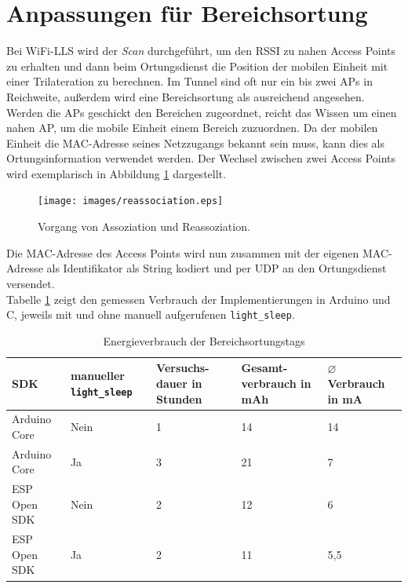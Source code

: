 \section{Anpassungen für Bereichsortung}
\label{ch:phase1:sec:anpassungbereich}
Bei WiFi-LLS wird der \emph{Scan} durchgeführt, um den RSSI zu nahen Access Points zu erhalten und dann beim Ortungsdienst die Position der mobilen Einheit mit einer Trilateration zu berechnen.
Im Tunnel sind oft nur ein bis zwei APs in Reichweite, außerdem wird eine Bereichsortung als ausreichend angesehen. \\
Werden die APs geschickt den Bereichen zugeordnet, reicht das Wissen um einen nahen AP, um die mobile Einheit einem Bereich zuzuordnen.
Da der mobilen Einheit die MAC-Adresse seines Netzzugangs bekannt sein muss, kann dies als Ortungsinformation verwendet werden.
Der Wechsel zwischen zwei Access Points wird exemplarisch in Abbildung \ref{fig:reassociation} dargestellt.

\begin{figure}[h!]
  \centering
	\texttt{[image: images/reassociation.eps]}
  \caption{Vorgang von Assoziation und Reassoziation.}
  \label{fig:reassociation}
\end{figure}

Die MAC-Adresse des Access Points wird nun zusammen mit der eigenen MAC-Adresse als Identifikator als String kodiert und per UDP an den Ortungsdienst versendet.\\
Tabelle \ref{table:naiveconsumption} zeigt den gemessen Verbrauch der Implementierungen in Arduino und C, jeweils mit und ohne manuell aufgerufenen \texttt{light\_sleep}.

\begin{table}[h]
	\centering
	\caption{Energieverbrauch der Bereichsortungstags}
	\label{table:naiveconsumption}
	\begin{tabular}{p{3cm}|p{2.2cm}|p{1.7cm}|p{2.5cm}|p{2.5cm}}
		SDK & manueller \texttt{light\_sleep} & Versuchs-dauer in Stunden & Gesamt-verbrauch in mAh & $\varnothing$ Verbrauch in mA \\
		\hline
		Arduino Core & Nein & 1 & 14 & 14 \\
		Arduino Core & Ja & 3 & 21 & 7 \\
		ESP Open SDK & Nein & 2 & 12 & 6 \\
		ESP Open SDK & Ja & 2 & 11 & 5,5 \\
	\end{tabular}
\end{table}

